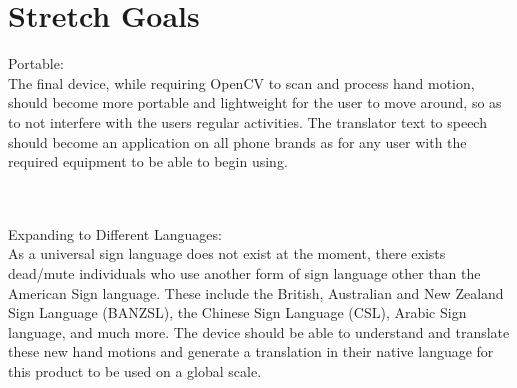 \documentclass{article}
\begin{document}
\section{Stretch Goals}

Portable:\\
The final device, while requiring OpenCV to scan and process hand motion, should become more portable and lightweight for the user
to move around, so as to not interfere with the user\textquotesingle s regular activities. The translator text to speech should
become an application on all phone brands as for any user with the required equipment to be able to begin using.

\\
\\Expanding to Different Languages:\\
As a universal sign language does not exist at the moment, there exists dead/mute individuals who use another form of sign language
other than the American Sign language. These include the British, Australian and New Zealand Sign Language (BANZSL), the Chinese Sign
Language (CSL), Arabic Sign language, and much more. The device should be able to understand and translate these new hand motions and
generate a translation in their native language for this product to be used on a global scale.
\end{document}
